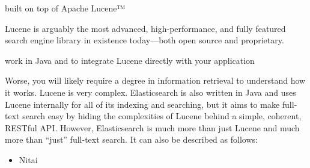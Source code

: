
built on top of Apache Lucene™

Lucene is arguably the most advanced, high-performance, and fully featured search engine library in existence today—both open source and proprietary.

work in Java and to integrate Lucene directly with your application

Worse, you will likely require a degree in information retrieval to understand how it works. Lucene is very complex.  Elasticsearch is also written in Java and uses Lucene internally for all of its indexing and searching, but it aims to make full-text search easy by hiding the complexities of Lucene behind a simple, coherent, RESTful API.  However, Elasticsearch is much more than just Lucene and much more than “just” full-text search. It can also be described as follows:
\begin{itemize}
	\item Nitai
\end{itemize}
